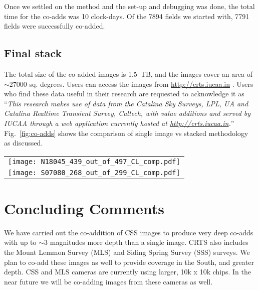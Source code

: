 \documentclass[fleqn,usenatbib]{mnras}
\begin{document}
Once we settled on the method and the set-up and debugging was done, the total time for the co-adds was 10 clock-days. Of the 7894 fields we started with, 7791 fields were successfully co-added.


\subsection{Final stack}\label{subsec:finalstack}

The total size of the co-added images is 1.5~TB, and the images cover an area of $\sim$27000 sq. degrees. Users can access the images from \url{http://crts.iucaa.in} . Users who find these data useful in their research are requested to acknowledge it as ``\textit{This research makes use of data from the Catalina Sky Surveys, LPL, UA and Catalina Realtime Transient Survey, Caltech, with value additions and served by IUCAA through a web application currently hosted at \url{http://crts.iucaa.in}.}'' Fig.~\ref{fig:co-adds} shows the comparison of single image vs stacked methodology as discussed.

\begin{figure*}
\centering
\begin{tabular}{c}
\texttt{[image: N18045\_439\_out\_of\_497\_CL\_comp.pdf]}\\
\texttt{[image: S07080\_268\_out\_of\_299\_CL\_comp.pdf]}
\end{tabular}
\caption{\textit{Top row :} A section of field N18045 $\sim12'$ on a side around RA, Dec 08h40m57.9354s +18d19m02.4383s. \textit{Top left :} you see a single-epoch image, and \textit{Top right :} you see the same section for the co-added image. This field had only 439 images, out of which 497 have gone in to the co-added image. \textit{Bottom row :} A section of field S07080 $\sim12'$ on a side around RA, Dec 15h01m21.1668s -07d01m17.2091s. \textit{Bottom left :} you see a single-epoch image, and \textit{Bottom right :} you see the same section for the co-added image. This field had only 268 images, out of which 299 have gone in to the co-added image. Note that defects in the single image are not seen in the co-added image.}
\label{fig:co-adds}
\end{figure*}

\section{Concluding Comments}\label{sec:future}
We have carried out the co-addition of CSS images to produce very deep co-adds with up to $\sim 3$ magnitudes more depth than a single image. CRTS also includes the Mount Lemmon Survey (MLS) and Siding Spring Survey (SSS) surveys. We plan to co-add these images as well to provide coverage in the South, and greater depth. CSS and MLS cameras are currently using larger, 10k x 10k chips. In the near future we will be co-adding images from these cameras as well.
\end{document}
